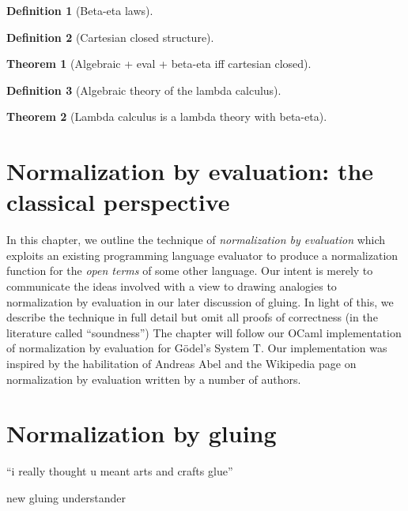 \documentclass[12pt,twoside]{reedthesis}
\theoremstyle{definition}
\newtheorem{definition}{Definition}
\theoremstyle{remark}
\theoremstyle{plain}
\newtheorem{theorem}{Theorem}
\begin{document}
\begin{definition}[Beta-eta laws]
\end{definition}

\begin{definition}[Cartesian closed structure]
\end{definition}

\begin{theorem}[Algebraic + eval + beta-eta iff cartesian closed]
\end{theorem}

\begin{definition}[Algebraic theory of the lambda calculus]
\end{definition}

\begin{theorem}[Lambda calculus is a lambda theory with beta-eta]
\end{theorem}

\chapter{Normalization by evaluation: the classical perspective}
In this chapter, we outline the technique of \emph{normalization by evaluation}
which exploits an existing programming language evaluator to produce a
normalization function for the \emph{open terms} of some other language. Our
intent is merely to communicate the ideas involved with a view to drawing
analogies to normalization by evaluation in our later discussion of gluing. In
light of this, we describe the technique in full detail but omit all proofs of
correctness (in the literature called ``soundness'') %
The chapter will follow our OCaml implementation of normalization by evaluation
for G\"odel's System T. Our implementation was inspired by the habilitation of
Andreas Abel and the Wikipedia page on normalization by evaluation written by a
number of authors.

\chapter{Normalization by gluing}
\epigraph{``i really thought u meant arts and crafts glue''}{new gluing understander}
\newcommand{\red}{\rightarrow^{*}} %
\end{document}

